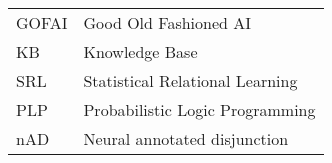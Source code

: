 \begin{flushleft}
\renewcommand{\arraystretch}{1.1}
\begin{tabularx}{\textwidth}{@{}p{12mm}X@{}}
GOFAI & Good Old Fashioned AI \\
KB & Knowledge Base \\
SRL & Statistical Relational Learning \\
PLP & Probabilistic Logic Programming \\
nAD & Neural annotated disjunction \\
\end{tabularx}
\end{flushleft}